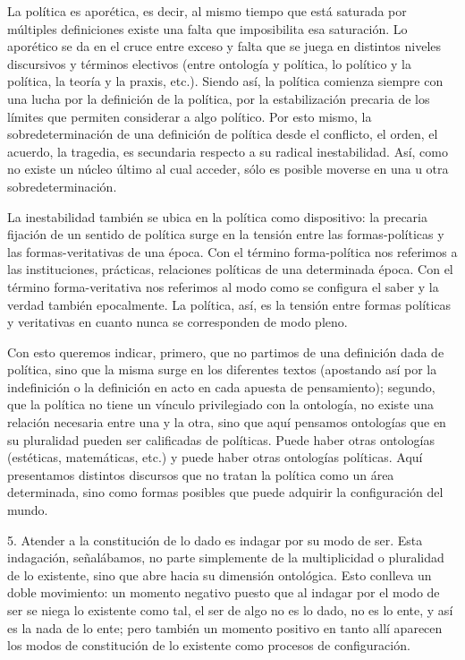 \documentclass{book}
\begin{document}
La política es aporética, es decir, al mismo tiempo que está saturada
por múltiples definiciones existe una falta que imposibilita esa
saturación. Lo aporético se da en el cruce entre exceso y falta que se
juega en distintos niveles discursivos y términos electivos (entre
ontología y política, lo político y la política, la teoría y la praxis,
etc.). Siendo así, la política comienza siempre con una lucha por la
definición de la política, por la estabilización precaria de los límites
que permiten considerar a algo político. Por esto mismo, la
sobredeterminación de una definición de política desde el conflicto, el
orden, el acuerdo, la tragedia, es secundaria respecto a su radical
inestabilidad. Así, como no existe un núcleo último al cual acceder,
sólo es posible moverse en una u otra sobredeterminación.

La inestabilidad también se ubica en la política como dispositivo: la
precaria fijación de un sentido de política surge en la tensión entre
las formas-políticas y las formas-veritativas de una época. Con el
término forma-política nos referimos a las instituciones, prácticas,
relaciones políticas de una determinada época. Con el término
forma-veritativa nos referimos al modo como se configura el saber y la
verdad también epocalmente. La política, así, es la tensión entre formas
políticas y veritativas en cuanto nunca se corresponden de modo pleno.

Con esto queremos indicar, primero, que no partimos de una definición
dada de política, sino que la misma surge en los diferentes textos
(apostando así por la indefinición o la definición en acto en cada
apuesta de pensamiento); segundo, que la política no tiene un vínculo
privilegiado con la ontología, no existe una relación necesaria entre
una y la otra, sino que aquí pensamos ontologías que en su pluralidad
pueden ser calificadas de políticas. Puede haber otras ontologías
(estéticas, matemáticas, etc.) y puede haber otras ontologías políticas.
Aquí presentamos distintos discursos que no tratan la política como un
área determinada, sino como formas posibles que puede adquirir la
configuración del mundo.

5. Atender a la constitución de lo dado es indagar por su modo de ser. Esta
indagación, señalábamos, no parte simplemente de la multiplicidad o
pluralidad de lo existente, sino que abre hacia su dimensión ontológica.
Esto conlleva un doble movimiento: un momento negativo puesto que al
indagar por el modo de ser se niega lo existente como tal, el ser de
algo no es lo dado, no es lo ente, y así es la nada de lo ente; pero
también un momento positivo en tanto allí aparecen los modos de
constitución de lo existente como procesos de configuración.
\end{document}
